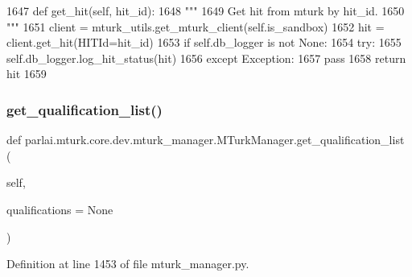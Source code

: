\begin{DoxyCode}
1647     \textcolor{keyword}{def }get\_hit(self, hit\_id):
1648         \textcolor{stringliteral}{"""}
1649 \textcolor{stringliteral}{        Get hit from mturk by hit\_id.}
1650 \textcolor{stringliteral}{        """}
1651         client = mturk\_utils.get\_mturk\_client(self.is\_sandbox)
1652         hit = client.get\_hit(HITId=hit\_id)
1653         \textcolor{keywordflow}{if} self.db\_logger \textcolor{keywordflow}{is} \textcolor{keywordflow}{not} \textcolor{keywordtype}{None}:
1654             \textcolor{keywordflow}{try}:
1655                 self.db\_logger.log\_hit\_status(hit)
1656             \textcolor{keywordflow}{except} Exception:
1657                 \textcolor{keywordflow}{pass}
1658         \textcolor{keywordflow}{return} hit
1659 
\end{DoxyCode}
\mbox{\label{classparlai_1_1mturk_1_1core_1_1dev_1_1mturk__manager_1_1MTurkManager_a1bd71362181f7e85c7556ff195457a23}} 
\subsubsection{\texorpdfstring{get\+\_\+qualification\+\_\+list()}{get\_qualification\_list()}}
{\footnotesize\ttfamily def parlai.\+mturk.\+core.\+dev.\+mturk\+\_\+manager.\+M\+Turk\+Manager.\+get\+\_\+qualification\+\_\+list (\begin{DoxyParamCaption}\item[{}]{self,  }\item[{}]{qualifications = {\ttfamily None} }\end{DoxyParamCaption})}



Definition at line 1453 of file mturk\+\_\+manager.\+py.



